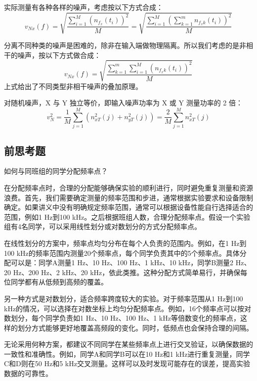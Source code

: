 实际测量有各种各样的噪声，考虑按以下方式合成：
\[
v_{Nx}(f) = \sqrt{\frac{\sum_{i=1}^{M} \left( n_{f_x}(t_i) \right)^2}{M}} = \sqrt{\frac{\sum_{i=1}^{M} \left( \sum_{k=1}^{m} n_{f_xk}(t_i) \right)^2}{M}} 
\]

分离不同种类的噪声是困难的，除非在输入端做物理隔离。所以我们考虑的是非相干的噪声，按以下方式做合成：
\[
v_{Nx}(f) = \sqrt{\frac{\sum_{k=1}^{m} \sum_{i=1}^{M} \left( n_{f_xk}(t_i) \right)^2}{M}}
\]
上式给出了不同类型非相干噪声的叠加原理。

对随机噪声，X 与 Y 独立等价，即输入噪声功率为 X 或 Y 测量功率的 2 倍：
\[
v_N^2 = \frac{1}{M} \sum_{j=1}^{M} \left( n_{xT}^2(j) + n_{yT}^2(j) \right) = \frac{2}{M} \sum_{j=1}^{M} n_{xT}^2(j)
\]

\subsection{前思考题}
\begin{question}
	如何与同班组的同学分配频率点？
\end{question}
在分配频率点时，合理的分配能够确保实验的顺利进行，同时避免重复测量和资源浪费。首先，我们需要确定测量的频率范围和步进，通常根据实验要求和设备限制确定。如果讲义中没有明确规定频率范围，通常可以根据设备性能自行选择适合的范围，例如1 Hz到100 kHz。之后根据班组人数，合理分配频率点。假设一个实验组有4名同学，可以采用线性划分或对数划分的方式分配频率点。

在线性划分的方案中，频率点均匀分布在每个人负责的范围内。例如，在1 Hz到100 kHz的频率范围内测量20个频率点，每个同学负责其中的5个频率点。具体分配可以是：同学A测量1 Hz、10 Hz、100 Hz、1 kHz、10 kHz，同学B测量2 Hz、20 Hz、200 Hz、2 kHz、20 kHz，依此类推。这种分配方式简单易行，并确保每位同学都有从低频到高频的覆盖。

另一种方式是对数划分，适合频率跨度较大的实验。对于频率范围从1 Hz到100 kHz的情况，可以选择在对数坐标上均匀分配频率点。例如，16个频率点可以按对数划分，每个同学负责如1 Hz、10 Hz、100 Hz、1 kHz等倍数变化的频率点，这样的划分方式能够更好地覆盖高频段的变化。同时，低频点也会保持合理的间隔。

无论采用何种方案，都建议不同同学在某些频率点上进行交叉验证，以确保数据的一致性和准确性。例如，同学A和同学B可以在10 Hz和1 kHz进行重复测量，同学C和D则在50 Hz和5 kHz交叉测量。这样可以及时发现可能存在的误差，提高实验数据的可靠性。
